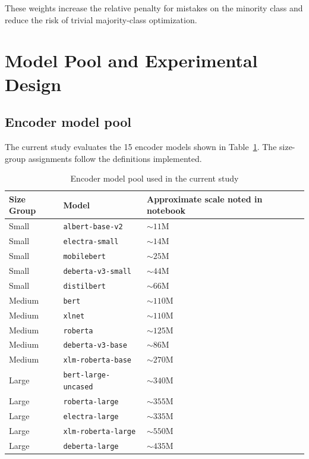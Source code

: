 \documentclass[11pt]{article}
\begin{document}
These weights increase the relative penalty for mistakes on the minority class and reduce the risk of trivial majority-class optimization.

\section{Model Pool and Experimental Design}

\subsection{Encoder model pool}

The current study evaluates the 15 encoder models shown in Table~\ref{tab:model-pool}. The size-group assignments follow the definitions implemented. 

\begin{table}[H]
\centering
\caption{Encoder model pool used in the current study}
\label{tab:model-pool}
\begin{tabular}{lll}
\toprule
Size Group & Model & Approximate scale noted in notebook \\
\midrule
Small & \texttt{albert-base-v2} & $\sim 11$M \\
Small & \texttt{electra-small} & $\sim 14$M \\
Small & \texttt{mobilebert} & $\sim 25$M \\
Small & \texttt{deberta-v3-small} & $\sim 44$M \\
Small & \texttt{distilbert} & $\sim 66$M \\
\midrule
Medium & \texttt{bert} & $\sim 110$M \\
Medium & \texttt{xlnet} & $\sim 110$M \\
Medium & \texttt{roberta} & $\sim 125$M \\
Medium & \texttt{deberta-v3-base} & $\sim 86$M \\
Medium & \texttt{xlm-roberta-base} & $\sim 270 $M\\
\midrule
Large & \texttt{bert-large-uncased} & $\sim 340$M \\
Large & \texttt{roberta-large} & $\sim 355$M \\
Large & \texttt{electra-large} & $\sim 335$M \\
Large & \texttt{xlm-roberta-large} & $\sim 550$M \\
Large & \texttt{deberta-large} & 
$\sim 435$M\\
\bottomrule
\end{tabular}
\end{table}
\end{document}
